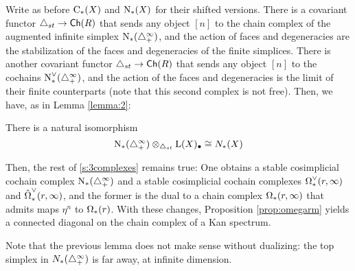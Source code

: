 Write as before $\operatorname{C}_{*}(X)$ and $\operatorname{N}_{*}(X)$ for their shifted versions. There is a covariant functor $\triangle_{st} \to \mathsf{Ch}(R)$ that sends any object $[n]$ to the chain complex of the augmented infinite simplex $\operatorname{N}_{*}(\triangle_{+}^\infty)$, and the action of faces and degeneracies are the stabilization of the faces and degeneracies of the finite simplices. There is another covariant functor $\triangle_{st} \to \mathsf{Ch}(R)$ that sends any object $[n]$ to the cochains $\operatorname{N}^\vee_{*}(\triangle_{+}^\infty)$, and the action of the faces and degeneracies is the limit of their finite counterparts (note that this second complex is not free). Then, we have, as in Lemma \ref{lemma:2}:

\begin{lemma}
	There is a natural isomorphism
	\[
	\operatorname{N}_{*}(\triangle_{+}^{\infty}) \otimes_{\triangle_{st}} \operatorname{L}(X)_\bullet \cong N_{*}(X)
	\]
\end{lemma}

Then, the rest of \cref{s:3complexes} remains true: One obtains a stable cosimplicial cochain complex $\operatorname{N}_{*}(\triangle_{+}^\infty)$ and a stable cosimplicial cochain complexes $\operatorname{\Omega}^{\vee}_{*}(r,\infty)$ and $\hat{\operatorname{\Omega}}^{\vee}_{*}(r,\infty)$, and the former is the dual to a chain complex $\operatorname{\Omega}_{*}(r,\infty)$ that admits maps $\eta^{n}$ to $\operatorname{\Omega}_{*}(r)$. With these changes, Proposition \ref{prop:omegarm} yields a connected diagonal on the chain complex of a Kan spectrum.

Note that the previous lemma does not make sense without dualizing: the top simplex in $N_*(\triangle_{+}^\infty)$ is far away, at infinite dimension.